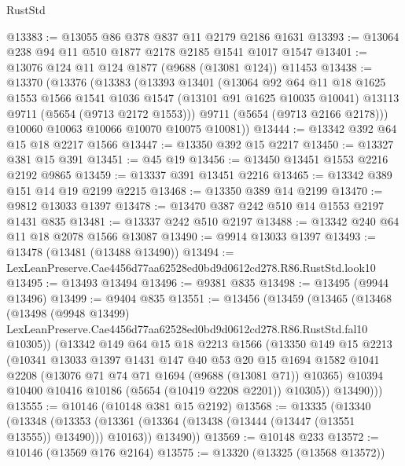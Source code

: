 \begin{lexlean}{RustStd}
\begin{coremodule}
@13383 := @13055 @86 @378 @837 @11 @2179 @2186 @1631
@13393 := @13064 @238 @94 @11 @510 @1877 @2178 @2185 @1541 @1017 @1547
@13401 := @13076 @124 @11 @124 @1877 (@9688 (@13081 @124)) @11453
@13438 := @13370
    (@13376
      (@13383
        (@13393
          @13401
          (@13064
            @92
            @64
            @11
            @18
            @1625
            @1553
            @1566
            @1541
            @1036
            @1547
            (@13101 @91 @1625 @10035 @10041)
            @13113
            @9711
            (@5654 (@9713 @2172 @1553)))
          @9711
          (@5654 (@9713 @2166 @2178)))
        @10060
        @10063
        @10066
        @10070
        @10075
        @10081))
@13444 := @13342 @392 @64 @15 @18 @2217 @1566
@13447 := @13350 @392 @15 @2217
@13450 := @13327 @381 @15 @391
@13451 := @45 @19
@13456 := @13450 @13451 @1553 @2216 @2192 @9865
@13459 := @13337 @391 @13451 @2216
@13465 := @13342 @389 @151 @14 @19 @2199 @2215
@13468 := @13350 @389 @14 @2199
@13470 := @9812 @13033 @1397
@13478 := @13470 @387 @242 @510 @14 @1553 @2197 @1431 @835
@13481 := @13337 @242 @510 @2197
@13488 := @13342 @240 @64 @11 @18 @2078 @1566 @13087
@13490 := @9914 @13033 @1397
@13493 := @13478 (@13481 (@13488 @13490))
@13494 := LexLeanPreserve.Cae4456d77aa62528ed0bd9d0612cd278.R86.RustStd.look10
@13495 := @13493 @13494
@13496 := @9381 @835
@13498 := @13495 (@9944 @13496)
@13499 := @9404 @835
@13551 := @13456
    (@13459
      (@13465
        (@13468
          (@13498
            (@9948 @13499)
            LexLeanPreserve.Cae4456d77aa62528ed0bd9d0612cd278.R86.RustStd.fal10
            @10305))
        (@13342
          @149
          @64
          @15
          @18
          @2213
          @1566
          (@13350
            @149
            @15
            @2213
            (@10341
              @13033
              @1397
              @1431
              @147
              @40
              @53
              @20
              @15
              @1694
              @1582
              @1041
              @2208
              (@13076 @71 @74 @71 @1694 (@9688 (@13081 @71)) @10365)
              @10394
              @10400
              @10416
              @10186
              (@5654 (@10419 @2208 @2201))
              @10305))
          @13490)))
@13555 := @10146 (@10148 @381 @15 @2192)
@13568 := @13335
    (@13340
      (@13348
        (@13353 (@13361 (@13364 (@13438 (@13444 (@13447 (@13551 @13555)) @13490))) @10163))
        @13490))
@13569 := @10148 @233
@13572 := @10146 (@13569 @176 @2164)
@13575 := @13320 (@13325 (@13568 @13572))

\end{coremodule}
\end{lexlean}
